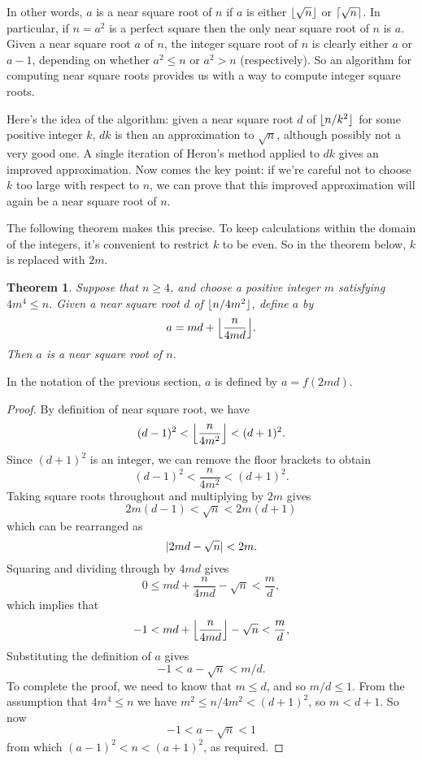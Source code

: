 \documentclass[a4paper]{article}
\DeclarePairedDelimiter\floor{\lfloor}{\rfloor}
\DeclarePairedDelimiter\ceil{\lceil}{\rceil}
\DeclarePairedDelimiter\abs{\lvert}{\rvert}
\theoremstyle{plain}
\newtheorem{theorem}{Theorem}
\theoremstyle{definition}
\begin{document}
In other words, $a$ is a near square root of $n$ if $a$ is either $\floor{\sqrt
n}$ or $\ceil{\sqrt n}$. In particular, if $n = a^2$ is a perfect square then
the only near square root of $n$ is $a$. Given a near square root $a$ of $n$,
the integer square root of $n$ is clearly either $a$ or $a-1$, depending on
whether $a^2 \le n$ or $a^2 > n$ (respectively). So an algorithm for computing
near square roots provides us with a way to compute integer square roots.

Here's the idea of the algorithm: given a near square root $d$ of $\floor{n /
k^2}$ for some positive integer $k$, $dk$ is then an approximation to $\sqrt
n$, although possibly not a very good one. A single iteration of Heron's method
applied to $dk$ gives an improved approximation. Now comes the key point: if
we're careful not to choose $k$ too large with respect to $n$, we can prove
that this improved approximation will again be a near square root of $n$.

The following theorem makes this precise. To keep calculations within the domain
of the integers, it's convenient to restrict $k$ to be even. So in the theorem
below, $k$ is replaced with $2m$.

\begin{theorem}
  Suppose that $n \ge 4$, and choose a positive integer $m$
  satisfying $4m^4 \le n$. Given a near square root $d$ of $\floor{n / 4m^2}$,
  define $a$ by
  $$ a = md + \floor*{\frac{n}{4md}}. $$
  Then $a$
  is a near square root of $n$.
\end{theorem}

In the notation of the previous section, $a$ is defined by $a = f(2md)$.

\begin{proof}
  By definition of near square root, we have
  $$ (d - 1)^2 < \floor*{\frac{n}{4m^2}} < (d + 1)^2.$$
  Since $(d + 1)^2$ is an integer, we can remove the floor brackets to obtain
  $$ (d - 1)^2 < \frac{n}{4m^2} < (d + 1)^2.$$
  Taking square roots throughout and multiplying by $2m$ gives
  $$ 2m(d - 1) < \sqrt n < 2m(d + 1)$$
  which can be rearranged as
  $$ \abs{2md - \sqrt n} < 2m. $$
  Squaring and dividing through by $4md$ gives
  $$ 0 \le md + \frac{n}{4md} - \sqrt n < \frac md,$$
  which implies that
  $$ -1 < md + \floor*{\frac{n}{4md}} - \sqrt n < \frac{m}{d},$$
  Substituting the definition of $a$ gives
  $$ -1 < a - \sqrt n < m / d.$$
  To complete the proof, we need to know that $m \le d$, and so $m / d \le 1$.
  From the assumption that $4m^4 \le n$ we have $m^2 \le n / 4m^2 < (d
  + 1)^2$, so $m < d + 1$. So now
  $$ -1 < a - \sqrt n < 1 $$
  from which $(a - 1)^2 < n < (a + 1)^2$, as required.
\end{proof}
\end{document}
